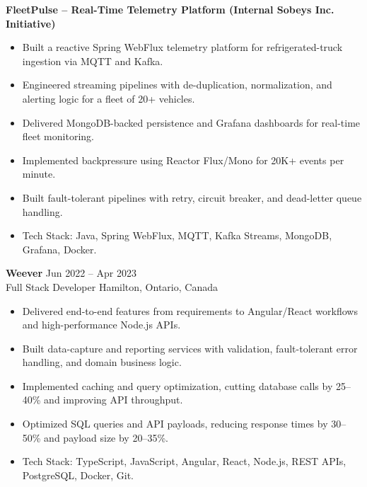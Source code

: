 \documentclass[10pt]{article}
\newcommand{\expentry}[4]{
\textbf{#1} \hfill #2 \\
#3 \hfill #4
}
\begin{document}
\textbf{FleetPulse -- Real-Time Telemetry Platform (Internal Sobeys Inc. Initiative)} 
\begin{itemize}
  \item Built a reactive Spring WebFlux telemetry platform for refrigerated-truck ingestion via MQTT and Kafka.
  \item Engineered streaming pipelines with de-duplication, normalization, and alerting logic for a fleet of 20+ vehicles.
  \item Delivered MongoDB-backed persistence and Grafana dashboards for real-time fleet monitoring.
  \item Implemented backpressure using Reactor Flux/Mono for 20K+ events per minute.
  \item Built fault-tolerant pipelines with retry, circuit breaker, and dead-letter queue handling.
  \item Tech Stack: Java, Spring WebFlux, MQTT, Kafka Streams, MongoDB, Grafana, Docker.
\end{itemize}

\expentry{Weever}{Jun 2022 -- Apr 2023}{Full Stack Developer}{Hamilton, Ontario, Canada}
\begin{itemize}
  \item Delivered end-to-end features from requirements to Angular/React workflows and high-performance Node.js APIs.
  \item Built data-capture and reporting services with validation, fault-tolerant error handling, and domain business logic.
  \item Implemented caching and query optimization, cutting database calls by 25--40\% and improving API throughput.
  \item Optimized SQL queries and API payloads, reducing response times by 30--50\% and payload size by 20--35\%.
  \item Tech Stack: TypeScript, JavaScript, Angular, React, Node.js, REST APIs, PostgreSQL, Docker, Git.
\end{itemize}
\end{document}

